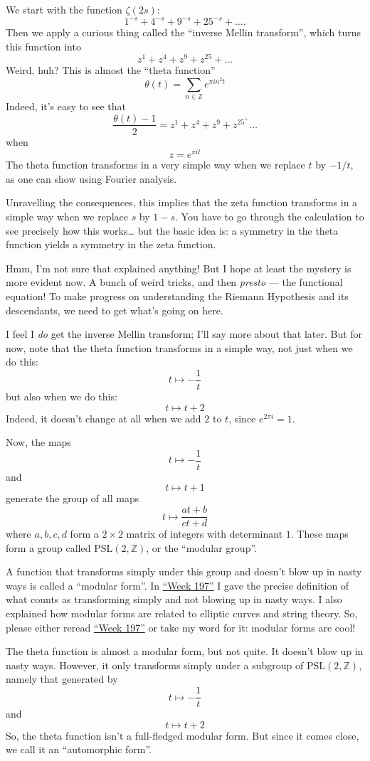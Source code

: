 \documentclass{article}
\begin{document}
We start with the function \(\zeta(2s)\):
\[1^{-s} + 4^{-s} + 9^{-s} + 25^{-s} + \ldots.\] Then we apply a curious
thing called the ``inverse Mellin transform'', which turns this function
into \[z^1 + z^4 + z^9 + z^{25} + \ldots\] Weird, huh? This is almost
the ``theta function''
\[\theta(t) = \sum_{n\in\mathbb{Z}} e^{\pi i n^2 t}\] Indeed, it's easy
to see that
\[\frac{\theta(t) - 1}{2} = z^1 + z^4 + z^9 + z^25^ + \ldots\] when
\[z = e^{\pi it}\] The theta function transforms in a very simple way
when we replace \(t\) by \(-1/t\), as one can show using Fourier
analysis.

Unravelling the consequences, this implies that the zeta function
transforms in a simple way when we replace \(s\) by \(1-s\). You have to
go through the calculation to see precisely how this works\ldots{} but
the basic idea is: a symmetry in the theta function yields a symmetry in
the zeta function.

Hmm, I'm not sure that explained anything! But I hope at least the
mystery is more evident now. A bunch of weird tricks, and then
\emph{presto} --- the functional equation! To make progress on
understanding the Riemann Hypothesis and its descendants, we need to get
what's going on here.

I feel I \emph{do} get the inverse Mellin transform; I'll say more about
that later. But for now, note that the theta function transforms in a
simple way, not just when we do this: \[t \mapsto -\frac{1}{t}\] but
also when we do this: \[t \mapsto t + 2\] Indeed, it doesn't change at
all when we add \(2\) to \(t\), since \(e^{2\pi i} = 1\).

Now, the maps \[t \mapsto -\frac1t\] and \[t \mapsto t + 1\] generate
the group of all maps \[t \mapsto \frac{at+b}{ct+d}\] where \(a,b,c,d\)
form a \(2\times2\) matrix of integers with determinant \(1\). These
maps form a group called \(\mathrm{PSL}(2,\mathbb{Z})\), or the
``modular group''.

A function that transforms simply under this group and doesn't blow up
in nasty ways is called a ``modular form''. In
\protect\hyperlink{week197}{``Week 197''} I gave the precise definition
of what counts as transforming simply and not blowing up in nasty ways.
I also explained how modular forms are related to elliptic curves and
string theory. So, please either reread
\protect\hyperlink{week197}{``Week 197''} or take my word for it:
modular forms are cool!

The theta function is almost a modular form, but not quite. It doesn't
blow up in nasty ways. However, it only transforms simply under a
subgroup of \(\mathrm{PSL}(2,\mathbb{Z})\), namely that generated by
\[t \mapsto -\frac1t\] and \[t \mapsto t + 2\] So, the theta function
isn't a full-fledged modular form. But since it comes close, we call it
an ``automorphic form''.
\end{document}
